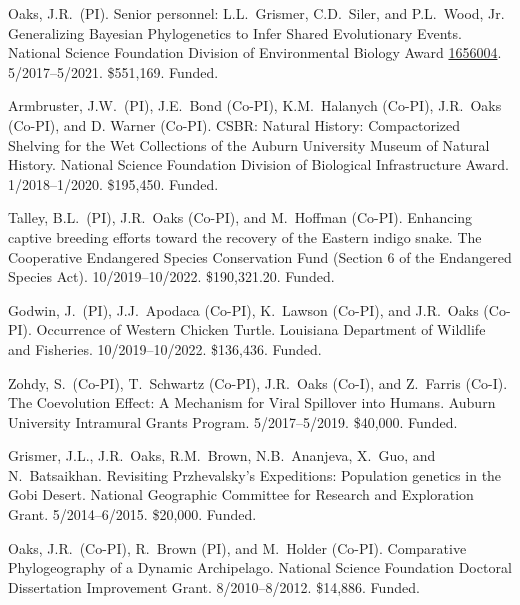 \myHangIndent
Oaks, J.R.\ (PI).
Senior personnel: L.L.\ Grismer, C.D.\ Siler, and P.L.\ Wood, Jr.
Generalizing Bayesian Phylogenetics to Infer Shared Evolutionary Events.
National Science Foundation Division of Environmental Biology Award
\href{https://www.nsf.gov/awardsearch/showAward?AWD_ID=1656004&HistoricalAwards=false}{1656004}.
5/2017--5/2021.
\$551,169.
Funded.

\myHangIndent
Armbruster, J.W.\ (PI),
J.E.\ Bond (Co-PI),
K.M.\ Halanych (Co-PI),
J.R.\ Oaks (Co-PI),
and
D. Warner (Co-PI).
CSBR: Natural History: Compactorized Shelving for the Wet Collections of the
Auburn University Museum of Natural History.
National Science Foundation Division of Biological Infrastructure Award.
1/2018--1/2020.
\$195,450.
Funded.


\myHangIndent
Talley, B.L.\ (PI),
J.R.\ Oaks (Co-PI),
and
M.\ Hoffman (Co-PI).
Enhancing captive breeding efforts toward the recovery of the Eastern indigo snake.
The Cooperative Endangered Species Conservation Fund (Section 6 of the
Endangered Species Act).
10/2019--10/2022.
\$190,321.20.
Funded.

\myHangIndent
Godwin, J.\ (PI),
J.J.\ Apodaca (Co-PI),
K.\ Lawson (Co-PI),
and
J.R.\ Oaks (Co-PI).
Occurrence of Western Chicken Turtle.
Louisiana Department of Wildlife and Fisheries.
10/2019--10/2022.
\$136,436.
Funded.

\myHangIndent
Zohdy, S.\ (Co-PI), T.\ Schwartz (Co-PI), J.R.\ Oaks (Co-I), and Z.\ Farris (Co-I).
The Coevolution Effect: A Mechanism for Viral Spillover into Humans.
Auburn University Intramural Grants Program.
5/2017--5/2019.
\$40,000.
Funded.

\myHangIndent
Grismer, J.L., J.R.\ Oaks, R.M.\ Brown, N.B.\ Ananjeva, X.\ Guo, and N.\
Batsaikhan.
Revisiting Przhevalsky's Expeditions: Population genetics in the Gobi Desert.
National Geographic Committee for Research and Exploration Grant.
5/2014--6/2015.
\$20,000.
Funded.

\myHangIndent
Oaks, J.R.\ (Co-PI), R.\ Brown (PI), and M.\ Holder (Co-PI).
Comparative Phylogeography of a Dynamic Archipelago.
National Science Foundation Doctoral Dissertation Improvement Grant.
8/2010--8/2012.
\$14,886.
Funded.


